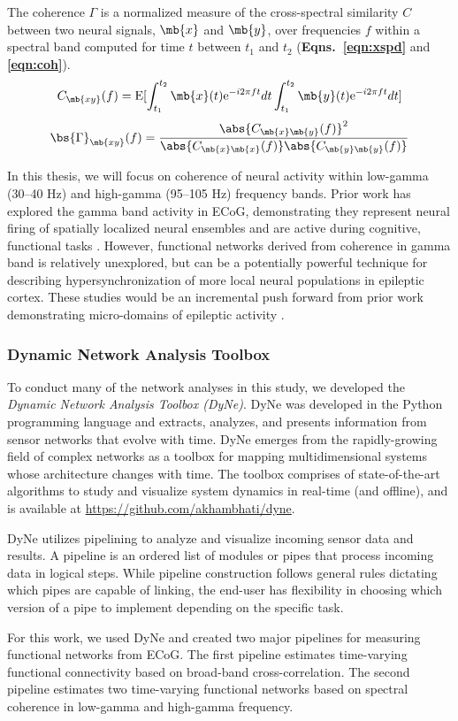 The coherence $\Gamma$ is a normalized measure of the cross-spectral similarity $C$ between two neural signals, $\mb{x}$ and $\mb{y}$, over frequencies $f$ within a spectral band computed for time $t$ between $t_1$ and $t_2$ (\textbf{Eqns.~\ref{eqn:xspd}} and \textbf{\ref{eqn:coh}}). 
\begin{eqnarray}
    C_{\mb{xy}}(f) = {\mathrm{E}}[\int_{t_1}^{t_2}\mb{x}(t)\mathrm{e}^{-i 2 \pi ft}dt \int_{t_1}^{t_2}\mb{y}(t)\mathrm{e}^{-i 2 \pi ft}dt]
\label{eqn:xspd}
\end{eqnarray}
\begin{eqnarray}
    \bs{\Gamma}_{\mb{xy}}(f) = \frac{\abs{C_{\mb{x}\mb{y}}(f)}^2}{\abs{C_{\mb{x}\mb{x}}(f)}\abs{C_{\mb{y}\mb{y}}(f)}}
\label{eqn:coh}
\end{eqnarray}

In this thesis, we will focus on coherence of neural activity within low-gamma (30--40 Hz) and high-gamma (95--105 Hz) frequency bands. Prior work has explored the gamma band activity in ECoG, demonstrating they represent neural firing of spatially localized neural ensembles and are active during cognitive, functional tasks  \cite{crone2006high-frequency}. However, functional networks derived from coherence in gamma band is relatively unexplored, but can be a potentially powerful technique for describing hypersynchronization of more local neural populations in epileptic cortex. These studies would be an incremental push forward from prior work demonstrating micro-domains of epileptic activity \cite{worrell2008high-frequency, schevon2009spatial, stead2010microseizures, viventi2011flexible, feldt_muldoon2013spatially, weiss2013ictal}.

\subsubsection{Dynamic Network Analysis Toolbox}
To conduct many of the network analyses in this study, we developed the \textit{Dynamic Network Analysis Toolbox (DyNe)}. DyNe was developed in the Python programming language and extracts, analyzes, and presents information from sensor networks that evolve with time. DyNe emerges from the rapidly-growing field of complex networks as a toolbox for mapping multidimensional systems whose architecture changes with time. The toolbox comprises of state-of-the-art algorithms to study and visualize system dynamics in real-time (and offline), and is available at \url{https://github.com/akhambhati/dyne}.

DyNe utilizes pipelining to analyze and visualize incoming sensor data and results. A pipeline is an ordered list of modules or pipes that process incoming data in logical steps. While pipeline construction follows general rules dictating which pipes are capable of linking, the end-user has flexibility in choosing which version of a pipe to implement depending on the specific task.

For this work, we used DyNe and created two major pipelines for measuring functional networks from ECoG. The first pipeline estimates time-varying functional connectivity based on broad-band cross-correlation. The second pipeline estimates two time-varying functional networks based on spectral coherence in low-gamma and high-gamma frequency.

